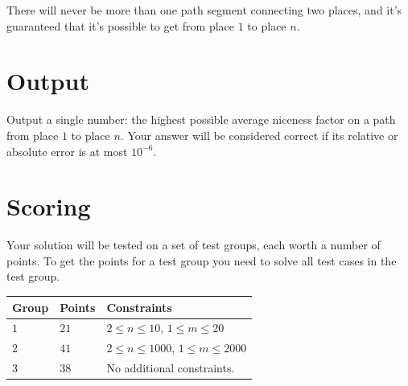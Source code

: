 There will never be more than one path segment connecting two places, and it's guaranteed that it's possible to get from place $1$ to place $n$.

\section*{Output}
Output a single number: the highest possible average niceness factor on a path from place $1$ to place $n$.
Your answer will be considered correct if its relative or absolute error is at most $10^{-6}$.

\section*{Scoring}
Your solution will be tested on a set of test groups, each worth a number of points.
To get the points for a test group you need to solve all test cases in the test group.

\noindent
\begin{tabular}{| l | l | l |}
\hline
Group & Points & Constraints \\ \hline
$1$     & $21$         &  $2 \le n \le 10$, $1 \le m \le 20$ \\ \hline
$2$     & $41$         &  $2 \le n \le 1000$, $1 \le m \le 2000$ \\ \hline
$3$     & $38$         & No additional constraints. \\ \hline
\end{tabular}
